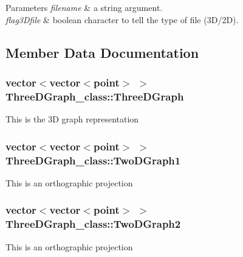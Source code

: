 \begin{DoxyParams}{Parameters}
{\em filename} & a string argument. \\
\hline
{\em flag3\+Dfile} & boolean character to tell the type of file (3\+D/2D). \\
\hline
\end{DoxyParams}


\subsection{Member Data Documentation}
\subsubsection[{\texorpdfstring{Three\+D\+Graph}{ThreeDGraph}}]{\setlength{\rightskip}{0pt plus 5cm}vector$<$vector$<${\bf point}$>$ $>$ Three\+D\+Graph\+\_\+class\+::\+Three\+D\+Graph\hspace{0.3cm}{\ttfamily [static]}}\hypertarget{classThreeDGraph__class_a31bf9a08590afa88789cf94892d60699}{}\label{classThreeDGraph__class_a31bf9a08590afa88789cf94892d60699}
This is the 3D graph representation 
\subsubsection[{\texorpdfstring{Two\+D\+Graph1}{TwoDGraph1}}]{\setlength{\rightskip}{0pt plus 5cm}vector$<$vector$<${\bf point}$>$ $>$ Three\+D\+Graph\+\_\+class\+::\+Two\+D\+Graph1\hspace{0.3cm}{\ttfamily [static]}}\hypertarget{classThreeDGraph__class_afa4d483e96f88439024919059fb918c6}{}\label{classThreeDGraph__class_afa4d483e96f88439024919059fb918c6}
This is an orthographic projection 
\subsubsection[{\texorpdfstring{Two\+D\+Graph2}{TwoDGraph2}}]{\setlength{\rightskip}{0pt plus 5cm}vector$<$vector$<${\bf point}$>$ $>$ Three\+D\+Graph\+\_\+class\+::\+Two\+D\+Graph2\hspace{0.3cm}{\ttfamily [static]}}\hypertarget{classThreeDGraph__class_acbdf53881ff18aeb73301dc1b7dc0880}{}\label{classThreeDGraph__class_acbdf53881ff18aeb73301dc1b7dc0880}
This is an orthographic projection 
